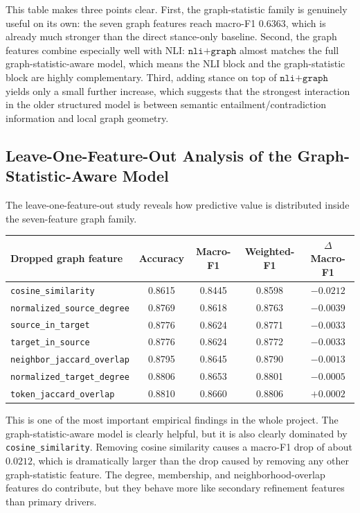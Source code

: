\documentclass[11pt,a4paper]{article}
\begin{document}
This table makes three points clear. First, the graph-statistic family is genuinely useful on its own: the seven graph
features reach macro-F1 \(0.6363\), which is already much stronger than the direct stance-only baseline. Second, the
graph features combine especially well with NLI: \(\texttt{nli+graph}\) almost matches the full graph-statistic-aware
model, which means the NLI block and the graph-statistic block are highly complementary. Third, adding stance on top of
\(\texttt{nli+graph}\) yields only a small further increase, which suggests that the strongest interaction in the older
structured model is between semantic entailment/contradiction information and local graph geometry.

\subsection{Leave-One-Feature-Out Analysis of the Graph-Statistic-Aware Model}
The leave-one-feature-out study reveals how predictive value is distributed inside the seven-feature graph family.

\begin{center}
\begin{tabular}{lcccc}
\toprule
Dropped graph feature & Accuracy & Macro-F1 & Weighted-F1 & \(\Delta\) Macro-F1 \\
\midrule
\texttt{cosine\_similarity} & 0.8615 & 0.8445 & 0.8598 & \(-0.0212\) \\
\texttt{normalized\_source\_degree} & 0.8769 & 0.8618 & 0.8763 & \(-0.0039\) \\
\texttt{source\_in\_target} & 0.8776 & 0.8624 & 0.8771 & \(-0.0033\) \\
\texttt{target\_in\_source} & 0.8776 & 0.8624 & 0.8772 & \(-0.0033\) \\
\texttt{neighbor\_jaccard\_overlap} & 0.8795 & 0.8645 & 0.8790 & \(-0.0013\) \\
\texttt{normalized\_target\_degree} & 0.8806 & 0.8653 & 0.8801 & \(-0.0005\) \\
\texttt{token\_jaccard\_overlap} & 0.8810 & 0.8660 & 0.8806 & \(+0.0002\) \\
\bottomrule
\end{tabular}
\end{center}

This is one of the most important empirical findings in the whole project. The graph-statistic-aware model is clearly
helpful, but it is also clearly dominated by \texttt{cosine\_similarity}. Removing cosine similarity causes a macro-F1
drop of about \(0.0212\), which is dramatically larger than the drop caused by removing any other graph-statistic
feature. The degree, membership, and neighborhood-overlap features do contribute, but they behave more like secondary
refinement features than primary drivers.
\end{document}
